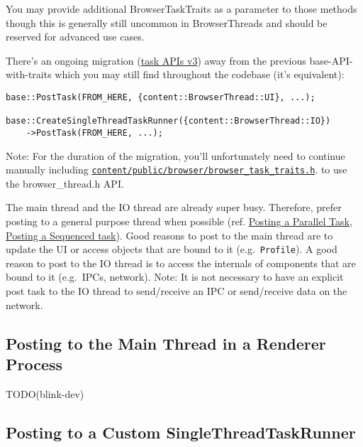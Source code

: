 \documentclass[a4paper,12pt,notitlepage,twoside,openright]{article}
\begin{document}
You may provide additional BrowserTaskTraits as a parameter to those
methods though this is generally still uncommon in BrowserThreads and
should be reserved for advanced use cases.

There's an ongoing migration
(\href{https://docs.google.com/document/d/1tssusPykvx3g0gvbvU4HxGyn3MjJlIylnsH13-Tv6s4/edit?ts=5de99a52\#heading=h.ss4tw38hvh3s}{task
APIs v3}) away from the previous base-API-with-traits which you may
still find throughout the codebase (it's equivalent):

\begin{verbatim}
base::PostTask(FROM_HERE, {content::BrowserThread::UI}, ...);

base::CreateSingleThreadTaskRunner({content::BrowserThread::IO})
    ->PostTask(FROM_HERE, ...);
\end{verbatim}

Note: For the duration of the migration, you'll unfortunately need to
continue manually including
\href{https://cs.chromium.org/chromium/src/content/public/browser/browser_task_traits.h}{\texttt{content/public/browser/browser\_task\_traits.h}}.
to use the browser\_thread.h API.

The main thread and the IO thread are already super busy. Therefore,
prefer posting to a general purpose thread when possible (ref.
\protect\hyperlink{Posting-a-Parallel-Task}{Posting a Parallel Task},
\protect\hyperlink{Posting-a-Sequenced-Task}{Posting a Sequenced task}).
Good reasons to post to the main thread are to update the UI or access
objects that are bound to it (e.g.~\texttt{Profile}). A good reason to
post to the IO thread is to access the internals of components that are
bound to it (e.g.~IPCs, network). Note: It is not necessary to have an
explicit post task to the IO thread to send/receive an IPC or
send/receive data on the network.

\hypertarget{posting-to-the-main-thread-in-a-renderer-process}{%
\subsection{Posting to the Main Thread in a Renderer
Process}\label{posting-to-the-main-thread-in-a-renderer-process}}

TODO(blink-dev)

\hypertarget{posting-to-a-custom-singlethreadtaskrunner}{%
\subsection{Posting to a Custom
SingleThreadTaskRunner}\label{posting-to-a-custom-singlethreadtaskrunner}}
\end{document}
